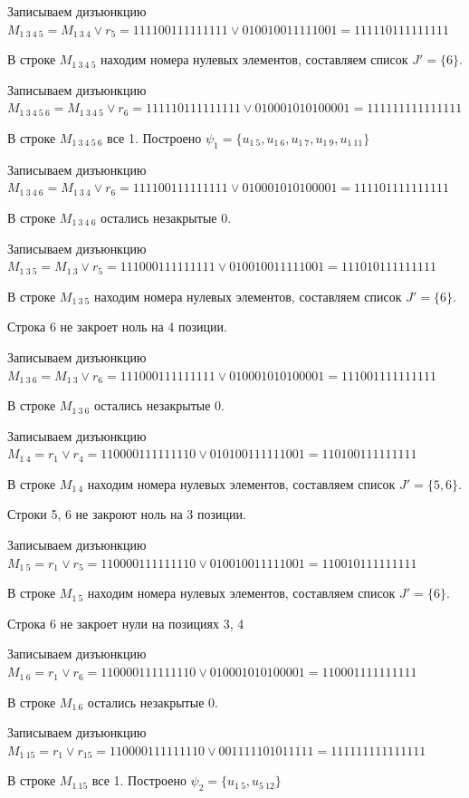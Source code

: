 \documentclass{article}
\begin{document}
Записываем дизъюнкцию $M_{1\ 3\ 4\ 5} = M_{1\ 3\ 4}\lor r_{5} = 111100111111111 \lor 010010011111001 = 111110111111111$

В строке $M_{1\ 3\ 4\ 5}$ находим номера нулевых элементов, составляем список $J' = \{6\}$.

Записываем дизъюнкцию $M_{1\ 3\ 4\ 5\ 6} = M_{1\ 3\ 4\ 5}\lor r_{6} = 111110111111111 \lor 010001010100001 = 111111111111111$

В строке $M_{1\ 3\ 4\ 5\ 6}$ все 1. Построено $\psi_{1} = \{u_{1\ 5},u_{1\ 6},u_{1\ 7},u_{1\ 9},u_{1\ 11}\}$

Записываем дизъюнкцию $M_{1\ 3\ 4\ 6} = M_{1\ 3\ 4}\lor r_{6} = 111100111111111 \lor 010001010100001 = 111101111111111$

В строке $M_{1\ 3\ 4\ 6}$ остались незакрытые 0.

Записываем дизъюнкцию $M_{1\ 3\ 5} = M_{1\ 3}\lor r_{5} = 111000111111111 \lor 010010011111001 = 111010111111111$

В строке $M_{1\ 3\ 5}$ находим номера нулевых элементов, составляем список $J' = \{6\}$.

Строка 6 не закроет ноль на 4 позиции.

Записываем дизъюнкцию $M_{1\ 3\ 6} = M_{1\ 3}\lor r_{6} = 111000111111111 \lor 010001010100001 = 111001111111111$

В строке $M_{1\ 3\ 6}$ остались незакрытые 0.

Записываем дизъюнкцию $M_{1\ 4} = r_{1}\lor r_{4} = 110000111111110 \lor 010100111111001 = 110100111111111$

В строке $M_{1\ 4}$ находим номера нулевых элементов, составляем список $J' = \{5, 6\}$.

Строки 5, 6 не закроют ноль на 3 позиции.

Записываем дизъюнкцию $M_{1\ 5} = r_{1}\lor r_{5} = 110000111111110 \lor 010010011111001 = 110010111111111$

В строке $M_{1\ 5}$ находим номера нулевых элементов, составляем список $J' = \{6\}$.

Строка 6 не закроет нули на позициях 3, 4

Записываем дизъюнкцию $M_{1\ 6} = r_{1}\lor r_{6} = 110000111111110 \lor 010001010100001 = 110001111111111$

В строке $M_{1\ 6}$ остались незакрытые 0.

Записываем дизъюнкцию $M_{1\ 15} = r_{1}\lor r_{15} = 110000111111110 \lor 001111101011111 = 111111111111111$

В строке $M_{1\ 15}$ все 1. Построено $\psi_{2} = \{u_{1\ 5},u_{5\ 12}\}$
\end{document}
